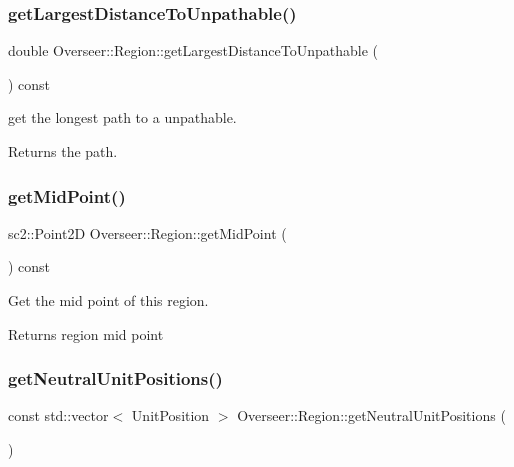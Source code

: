 \subsubsection{\texorpdfstring{get\+Largest\+Distance\+To\+Unpathable()}{getLargestDistanceToUnpathable()}}
{\footnotesize\ttfamily double Overseer\+::\+Region\+::get\+Largest\+Distance\+To\+Unpathable (\begin{DoxyParamCaption}{ }\end{DoxyParamCaption}) const}



get the longest path to a unpathable. 

\begin{DoxyReturn}{Returns}
the path. 
\end{DoxyReturn}
\mbox{\label{classOverseer_1_1Region_aabaca16412cb07744db2807121450c1e}} 
\subsubsection{\texorpdfstring{get\+Mid\+Point()}{getMidPoint()}}
{\footnotesize\ttfamily sc2\+::\+Point2D Overseer\+::\+Region\+::get\+Mid\+Point (\begin{DoxyParamCaption}{ }\end{DoxyParamCaption}) const}



Get the mid point of this region. 

\begin{DoxyReturn}{Returns}
region mid point 
\end{DoxyReturn}
\mbox{\label{classOverseer_1_1Region_a9ac3f900c0b0b260ded354769337149d}} 
\subsubsection{\texorpdfstring{get\+Neutral\+Unit\+Positions()}{getNeutralUnitPositions()}}
{\footnotesize\ttfamily const std\+::vector$<$ Unit\+Position $>$ Overseer\+::\+Region\+::get\+Neutral\+Unit\+Positions (\begin{DoxyParamCaption}{ }\end{DoxyParamCaption})}



